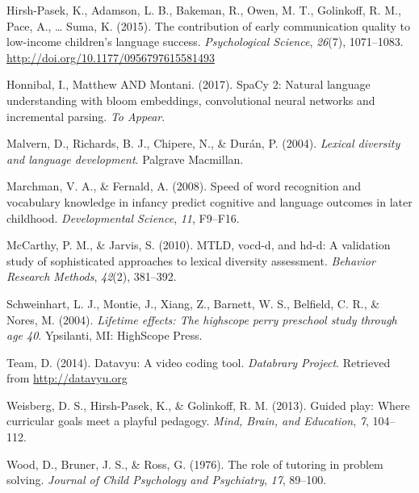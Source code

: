 \documentclass[man,floatsintext]{apa6}
\begin{document}
\leavevmode\hypertarget{ref-HirshPasek2015}{}%
Hirsh-Pasek, K., Adamson, L. B., Bakeman, R., Owen, M. T., Golinkoff, R. M., Pace, A., \ldots{} Suma, K. (2015). The contribution of early communication quality to low-income children's language success. \emph{Psychological Science}, \emph{26}(7), 1071--1083. \url{http://doi.org/10.1177/0956797615581493}

\leavevmode\hypertarget{ref-spacy2}{}%
Honnibal, I., Matthew AND Montani. (2017). SpaCy 2: Natural language understanding with bloom embeddings, convolutional neural networks and incremental parsing. \emph{To Appear}.

\leavevmode\hypertarget{ref-Malvern2004}{}%
Malvern, D., Richards, B. J., Chipere, N., \& Durán, P. (2004). \emph{Lexical diversity and language development}. Palgrave Macmillan.

\leavevmode\hypertarget{ref-Marchman2008}{}%
Marchman, V. A., \& Fernald, A. (2008). Speed of word recognition and vocabulary knowledge in infancy predict cognitive and language outcomes in later childhood. \emph{Developmental Science}, \emph{11}, F9--F16.

\leavevmode\hypertarget{ref-McCarthy2010}{}%
McCarthy, P. M., \& Jarvis, S. (2010). MTLD, vocd-d, and hd-d: A validation study of sophisticated approaches to lexical diversity assessment. \emph{Behavior Research Methods}, \emph{42}(2), 381--392.

\leavevmode\hypertarget{ref-PerryPreschool2004}{}%
Schweinhart, L. J., Montie, J., Xiang, Z., Barnett, W. S., Belfield, C. R., \& Nores, M. (2004). \emph{Lifetime effects: The highscope perry preschool study through age 40}. Ypsilanti, MI: HighScope Press.

\leavevmode\hypertarget{ref-datavyu}{}%
Team, D. (2014). Datavyu: A video coding tool. \emph{Databrary Project}. Retrieved from \url{http://datavyu.org}

\leavevmode\hypertarget{ref-Weisberg2013}{}%
Weisberg, D. S., Hirsh-Pasek, K., \& Golinkoff, R. M. (2013). Guided play: Where curricular goals meet a playful pedagogy. \emph{Mind, Brain, and Education}, \emph{7}, 104--112.

\leavevmode\hypertarget{ref-Wood1976}{}%
Wood, D., Bruner, J. S., \& Ross, G. (1976). The role of tutoring in problem solving. \emph{Journal of Child Psychology and Psychiatry}, \emph{17}, 89--100.

\endgroup

\clearpage
\makeatletter
\efloat@restorefloats
\makeatother
\end{document}

